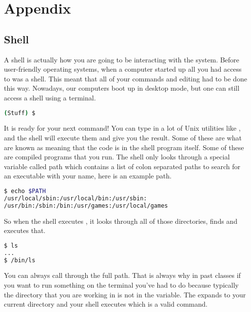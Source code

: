 \chapter{Appendix}

\section{Shell}

A shell is actually how you are going to be interacting with the system. Before user-friendly operating systems, when a computer started up all you had access to was a shell. This meant that all of your commands and editing had to be done this way. Nowadays, our computers boot up in desktop mode, but one can still access a shell using a terminal.

\begin{lstlisting}[language=bash]
(Stuff) $
\end{lstlisting}

It is ready for your next command! You can type in a lot of Unix utilities like ,  and the shell will execute them and give you the result. Some of these are what are known as  meaning that the code is in the shell program itself. Some of these are compiled programs that you run. The shell only looks through a special variable called path which contains a list of colon separated paths to search for an executable with your name, here is an example path.

\begin{lstlisting}[language=bash]
$ echo $PATH
/usr/local/sbin:/usr/local/bin:/usr/sbin:
/usr/bin:/sbin:/bin:/usr/games:/usr/local/games
\end{lstlisting}

So when the shell executes , it looks through all of those directories, finds  and executes that.

\begin{lstlisting}[language=bash]
$ ls
...
$ /bin/ls
\end{lstlisting}

You can always call through the full path. That is always why in past classes if you want to run something on the terminal you've had to do  because typically the directory that you are working in is not in the  variable. The  expands to your current directory and your shell executes  which is a valid command.

